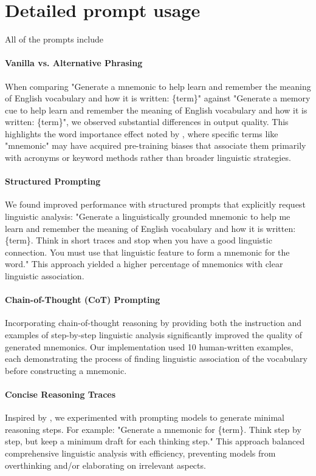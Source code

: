 \documentclass[11pt]{article}
\begin{document}
\clearpage
\appendix

\section{Detailed prompt usage} \label{app:prompt-usage}

All of the prompts include

\paragraph{Vanilla vs. Alternative Phrasing} When comparing "Generate a mnemonic to help learn and remember the meaning of English vocabulary and how it is written: \{term\}" against "Generate a memory cue to help learn and remember the meaning of English vocabulary and how it is written: \{term\}", we observed substantial differences in output quality. This highlights the word importance effect noted by \citet{hackmannWordImportanceExplains2024}, where specific terms like "mnemonic" may have acquired pre-training biases that associate them primarily with acronyms or keyword methods rather than broader linguistic strategies.

\paragraph{Structured Prompting} We found improved performance with structured prompts that explicitly request linguistic analysis: "Generate a linguistically grounded mnemonic to help me learn and remember the meaning of English vocabulary and how it is written: \{term\}. Think in short traces and stop when you have a good linguistic connection. You must use that linguistic feature to form a mnemonic for the word." This approach yielded a higher percentage of mnemonics with clear linguistic association.

\paragraph{Chain-of-Thought (CoT) Prompting} Incorporating chain-of-thought reasoning by providing both the instruction and examples of step-by-step linguistic analysis significantly improved the quality of generated mnemonics. Our implementation used 10 human-written examples, each demonstrating the process of finding linguistic association of the vocabulary before constructing a mnemonic.

\paragraph{Concise Reasoning Traces} Inspired by \citet{xuChainDraftThinking2025}, we experimented with prompting models to generate minimal reasoning steps. For example: "Generate a mnemonic for \{term\}. Think step by step, but keep a minimum draft for each thinking step." This approach balanced comprehensive linguistic analysis with efficiency, preventing models from overthinking and/or elaborating on irrelevant aspects.
\end{document}
